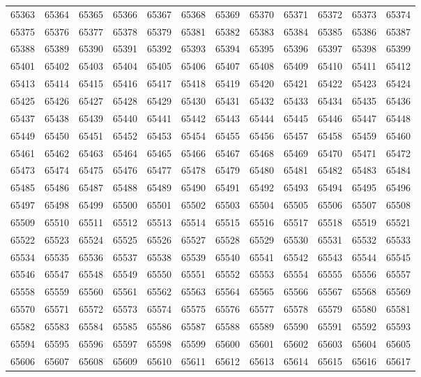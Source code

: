 \begin{center}
\begin{longtable}{llllllllllll}
65363 &65364 &65365 &65366 &65367 &65368 &65369 &65370 &65371 &65372 &65373 &65374 \\
65375 &65376 &65377 &65378 &65379 &65381 &65382 &65383 &65384 &65385 &65386 &65387 \\
65388 &65389 &65390 &65391 &65392 &65393 &65394 &65395 &65396 &65397 &65398 &65399 \\
65401 &65402 &65403 &65404 &65405 &65406 &65407 &65408 &65409 &65410 &65411 &65412 \\
65413 &65414 &65415 &65416 &65417 &65418 &65419 &65420 &65421 &65422 &65423 &65424 \\
65425 &65426 &65427 &65428 &65429 &65430 &65431 &65432 &65433 &65434 &65435 &65436 \\
65437 &65438 &65439 &65440 &65441 &65442 &65443 &65444 &65445 &65446 &65447 &65448 \\
65449 &65450 &65451 &65452 &65453 &65454 &65455 &65456 &65457 &65458 &65459 &65460 \\
65461 &65462 &65463 &65464 &65465 &65466 &65467 &65468 &65469 &65470 &65471 &65472 \\
65473 &65474 &65475 &65476 &65477 &65478 &65479 &65480 &65481 &65482 &65483 &65484 \\
65485 &65486 &65487 &65488 &65489 &65490 &65491 &65492 &65493 &65494 &65495 &65496 \\
65497 &65498 &65499 &65500 &65501 &65502 &65503 &65504 &65505 &65506 &65507 &65508 \\
65509 &65510 &65511 &65512 &65513 &65514 &65515 &65516 &65517 &65518 &65519 &65521 \\
65522 &65523 &65524 &65525 &65526 &65527 &65528 &65529 &65530 &65531 &65532 &65533 \\
65534 &65535 &65536 &65537 &65538 &65539 &65540 &65541 &65542 &65543 &65544 &65545 \\
65546 &65547 &65548 &65549 &65550 &65551 &65552 &65553 &65554 &65555 &65556 &65557 \\
65558 &65559 &65560 &65561 &65562 &65563 &65564 &65565 &65566 &65567 &65568 &65569 \\
65570 &65571 &65572 &65573 &65574 &65575 &65576 &65577 &65578 &65579 &65580 &65581 \\
65582 &65583 &65584 &65585 &65586 &65587 &65588 &65589 &65590 &65591 &65592 &65593 \\
65594 &65595 &65596 &65597 &65598 &65599 &65600 &65601 &65602 &65603 &65604 &65605 \\
65606 &65607 &65608 &65609 &65610 &65611 &65612 &65613 &65614 &65615 &65616 &65617 \\

\end{longtable}
\end{center}
